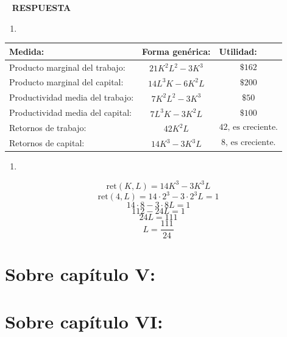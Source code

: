 \documentclass[
  letterpaper,
  DIV=11,
  numbers=noendperiod]{scrreport}
\providecommand{\tightlist}{%
  \setlength{\itemsep}{0pt}\setlength{\parskip}{0pt}}\usepackage{longtable,booktabs,array}
\begin{document}
~ \textbf{RESPUESTA}

\begin{enumerate}
\def\labelenumi{\arabic{enumi})}
\tightlist
\item
\end{enumerate}

\begin{table}[h]
    \centering
    \begin{tabular}{|p{40mm}|p{40mm}|p{40mm}|}
        \hline
        Medida: & Forma genérica: & Utilidad: \\\hline
        Producto marginal del trabajo: & \[21K^2L^2-3K^3\] & \[\$162\] \\\hline
        Producto marginal del capital: &  \[14L^3K-6K^2L\] & \[\$200\]\\\hline
        Productividad media del trabajo: & \[7K^2L^2-3K^3\] & \[\$50\] \\\hline
        Productividad media del capital: & \[7L^3K-3K^2L\] & \[\$100\] \\\hline
        Retornos de trabajo: & \[42K^2L\] & \[42 \text{, es creciente.}\] \\\hline 
        Retornos de capital: & \[14K^3 - 3K^3L\] & \[8 \text{, es creciente.}\] \\\hline
    \end{tabular}
    
\end{table}

\begin{enumerate}
\def\labelenumi{\arabic{enumi})}
\setcounter{enumi}{1}
\tightlist
\item
\end{enumerate}

\[
\text{ret}(K,L)=14K^3 - 3K^3L
\] \[
\text{ret}(4,L)=14\cdot 2^3 - 3\cdot 2^3L=1
\] \[
14\cdot 8 - 3\cdot 8 L=1
\] \[
112 - 24L=1
\] \[
24L=111
\] \[
L=\frac{111}{24}
\]


\hypertarget{sobre-capuxedtulo-v}{%
\chapter{Sobre capítulo V:}\label{sobre-capuxedtulo-v}}


\hypertarget{sobre-capuxedtulo-vi-1}{%
\chapter{Sobre capítulo VI:}\label{sobre-capuxedtulo-vi-1}}
\end{document}

